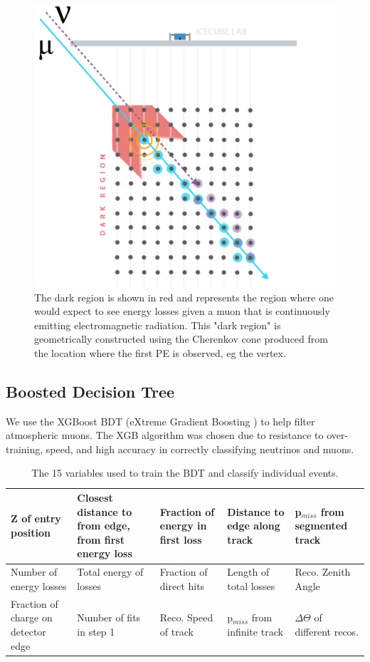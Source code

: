 \documentclass{PoS}
\begin{document}
\begin{figure}[h!]
\centering 
    \includegraphics[width=0.85\linewidth]{VetoGraphic_V2_AtmoNu.png}
    \caption{The dark region is shown in red and represents the region where one would expect to see energy losses given a muon that is continuously emitting electromagnetic radiation. This "dark region" is geometrically constructed using the Cherenkov cone produced from the location where the first PE is observed, eg the vertex. }
\label{fig:STV}
\end{figure}

\subsection{Boosted Decision Tree}\label{sec:ESTES_BDT}
We use the XGBoost BDT (eXtreme Gradient Boosting \cite{Chen:2016:XST:2939672.2939785})  to help filter atmospheric muons. The XGB algorithm was chosen due to resistance to over-training, speed, and high accuracy in correctly classifying neutrinos and muons.\\

\begin{table}[h!]
\footnotesize
\centering 
\begin{tabular}{|p{2.5cm}|p{2.5cm}|p{2.5cm}|p{2.5cm}|p{2.5cm}|}
\hline
Z of entry position & Closest distance to from edge, from first energy loss & Fraction of energy in first loss & Distance to edge along track & p$_{miss}$ from segmented track \\ \hline
Number of energy losses & Total energy of losses & Fraction of direct hits &  Length of total losses & Reco. Zenith Angle \\ \hline
Fraction of charge on detector edge & Number of fits in step 1 & Reco. Speed of track & p$_{miss}$ from infinite track & $\Delta \Theta$ of different recos. \\ \hline 
\end{tabular}
\caption{The 15 variables used to train the BDT and classify individual events.}
\label{tab:BDT_variables}
\end{table}
\end{document}
